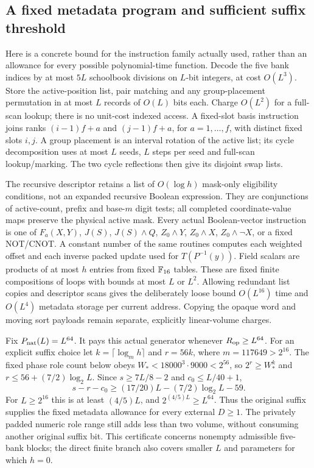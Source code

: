 \subsection{A fixed metadata program and sufficient suffix threshold}

Here is a concrete bound for the instruction family actually used,
rather than an allowance for every possible polynomial-time function.
Decode the five bank indices by at most $5L$ schoolbook divisions on
$L$-bit integers, at cost $O(L^3)$. Store the active-position list,
pair matching and any group-placement permutation in at most $L$
records of $O(L)$ bits each. Charge $O(L^2)$ for a full-scan lookup;
there is no unit-cost indexed access. A fixed-slot basis instruction
joins ranks $(i-1)f+a$ and $(j-1)f+a$, for $a=1,\ldots,f$, with
distinct fixed slots $i,j$. A group placement is an interval rotation
of the active list; its cycle decomposition uses at most $L$ seeds,
$L$ steps per seed and full-scan lookup/marking. The two cycle
reflections then give its disjoint swap lists.

The recursive descriptor retains a list of $O(\log h)$ mask-only
eligibility conditions, not an expanded recursive Boolean expression.
They are conjunctions of active-count, prefix and base-$m$ digit tests;
all completed coordinate-value maps preserve the physical active mask.
Every actual Boolean-vector instruction is one of $F_a(X,Y)$,
$J(S)$, $J(S)\wedge Q$, $Z_0\wedge Y$, $Z_0\wedge X$,
$Z_0\wedge\neg X$, or a fixed NOT/CNOT. A constant number of the
same routines computes each weighted offset and each inverse packed
update used for $T(P^{-1}(y))$. Field scalars are products of at most
$h$ entries from fixed $\mathbb F_{16}$ tables. These are fixed finite
compositions of loops with bounds at most $L$ or $L^2$. Allowing
redundant list copies and descriptor scans gives the deliberately
loose bound $O(L^{16})$ time and $O(L^4)$ metadata storage per current
address. Copying the opaque word and moving sort payloads remain
separate, explicitly linear-volume charges.

Fix $P_{\rm nat}(L)=L^{64}$. It pays this actual generator whenever
$R_{\rm op}\ge L^{64}$. For an explicit suffix choice let
$k=\lceil\log_m h\rceil$ and $r=56k$, where $m=117649>2^{16}$.
The fixed phase role count below obeys
$W_*<18000^3\cdot9000<2^{56}$, so $2^r\ge W_*^k$ and
$r\le56+(7/2)\log_2 L$. Since $s\ge7L/8-2$ and
$c_0\le L/40+1$,
\[
 s-r-c_0\ge(17/20)L-(7/2)\log_2 L-59.
\]
For $L\ge2^{16}$ this is at least $(4/5)L$, and
$2^{(4/5)L}\ge L^{64}$. Thus the original suffix supplies the fixed
metadata allowance for every external $D\ge1$. The privately padded
numeric role range still adds less than two volume, without consuming
another original suffix bit. This certificate concerns nonempty
admissible five-bank blocks; the direct finite branch also covers
smaller $L$ and parameters for which $h=0$.

